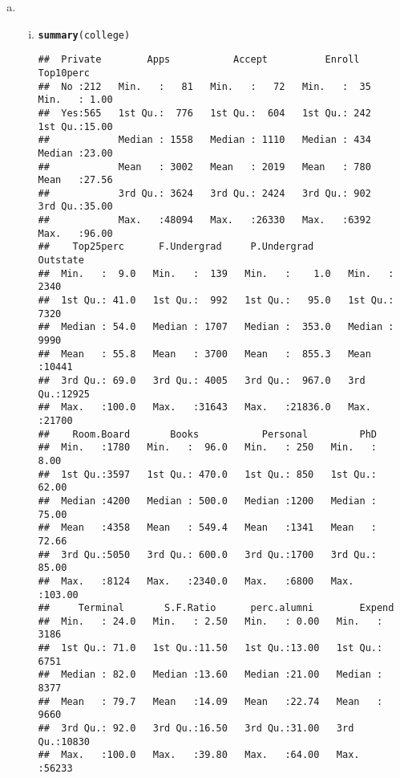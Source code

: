\documentclass{article}\usepackage[]{graphicx}\usepackage[]{color}
\makeatletter
\newcommand{\hlstd}[1]{\textcolor[rgb]{0.345,0.345,0.345}{#1}}%
\newcommand{\hlkwd}[1]{\textcolor[rgb]{0.737,0.353,0.396}{\textbf{#1}}}%
\newenvironment{kframe}{%
 \def\at@end@of@kframe{}%
 \ifinner\ifhmode%
  \def\at@end@of@kframe{\end{minipage}}%
  \begin{minipage}{\columnwidth}%
 \fi\fi%
 \def\FrameCommand##1{\hskip\@totalleftmargin \hskip-\fboxsep
 \colorbox{shadecolor}{##1}\hskip-\fboxsep
     \hskip-\linewidth \hskip-\@totalleftmargin \hskip\columnwidth}%
 \MakeFramed {\advance\hsize-\width
   \@totalleftmargin\z@ \linewidth\hsize
   \@setminipage}}%
 {\par\unskip\endMakeFramed%
 \at@end@of@kframe}
\newenvironment{knitrout}{}{} %
\makeatother
\begin{document}
\begin{enumerate}[(a)]
\begin{knitrout}
\end{knitrout}

\item
\begin{enumerate}[(i)]
\item
\begin{knitrout}
\color{fgcolor}\begin{kframe}
\begin{alltt}
\hlkwd{summary}\hlstd{(college)}
\end{alltt}
\begin{verbatim}
##  Private        Apps           Accept          Enroll       Top10perc    
##  No :212   Min.   :   81   Min.   :   72   Min.   :  35   Min.   : 1.00  
##  Yes:565   1st Qu.:  776   1st Qu.:  604   1st Qu.: 242   1st Qu.:15.00  
##            Median : 1558   Median : 1110   Median : 434   Median :23.00  
##            Mean   : 3002   Mean   : 2019   Mean   : 780   Mean   :27.56  
##            3rd Qu.: 3624   3rd Qu.: 2424   3rd Qu.: 902   3rd Qu.:35.00  
##            Max.   :48094   Max.   :26330   Max.   :6392   Max.   :96.00  
##    Top25perc      F.Undergrad     P.Undergrad         Outstate    
##  Min.   :  9.0   Min.   :  139   Min.   :    1.0   Min.   : 2340  
##  1st Qu.: 41.0   1st Qu.:  992   1st Qu.:   95.0   1st Qu.: 7320  
##  Median : 54.0   Median : 1707   Median :  353.0   Median : 9990  
##  Mean   : 55.8   Mean   : 3700   Mean   :  855.3   Mean   :10441  
##  3rd Qu.: 69.0   3rd Qu.: 4005   3rd Qu.:  967.0   3rd Qu.:12925  
##  Max.   :100.0   Max.   :31643   Max.   :21836.0   Max.   :21700  
##    Room.Board       Books           Personal         PhD        
##  Min.   :1780   Min.   :  96.0   Min.   : 250   Min.   :  8.00  
##  1st Qu.:3597   1st Qu.: 470.0   1st Qu.: 850   1st Qu.: 62.00  
##  Median :4200   Median : 500.0   Median :1200   Median : 75.00  
##  Mean   :4358   Mean   : 549.4   Mean   :1341   Mean   : 72.66  
##  3rd Qu.:5050   3rd Qu.: 600.0   3rd Qu.:1700   3rd Qu.: 85.00  
##  Max.   :8124   Max.   :2340.0   Max.   :6800   Max.   :103.00  
##     Terminal       S.F.Ratio      perc.alumni        Expend     
##  Min.   : 24.0   Min.   : 2.50   Min.   : 0.00   Min.   : 3186  
##  1st Qu.: 71.0   1st Qu.:11.50   1st Qu.:13.00   1st Qu.: 6751  
##  Median : 82.0   Median :13.60   Median :21.00   Median : 8377  
##  Mean   : 79.7   Mean   :14.09   Mean   :22.74   Mean   : 9660  
##  3rd Qu.: 92.0   3rd Qu.:16.50   3rd Qu.:31.00   3rd Qu.:10830  
##  Max.   :100.0   Max.   :39.80   Max.   :64.00   Max.   :56233  

\end{verbatim}
\end{kframe}
\end{knitrout}
\end{enumerate}
\end{enumerate}
\end{document}
